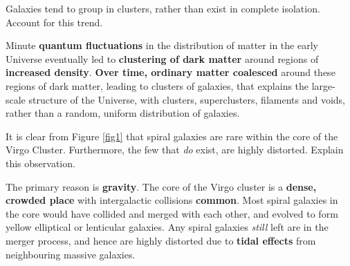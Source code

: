 \documentclass[a4paper,11pt]{exam}
\begin{document}
\begin{questions}
\clearpage
{}
\question[2]\label{1f}
	Galaxies tend to group in clusters, rather than exist in complete isolation. Account for this trend.
	\droppoints
	\begin{solution}
		Minute \textbf{quantum fluctuations} in the distribution of matter in the early Universe eventually led to \textbf{clustering of dark matter} around regions of \textbf{increased density}. \textbf{Over time, ordinary matter coalesced} around these regions of dark matter, leading to clusters of galaxies, that explains the large-scale structure of the Universe, with clusters, superclusters, filaments and voids, rather than a random, uniform distribution of galaxies. 
	\end{solution}

\question[2]\label{1g}
	It is clear from Figure \ref{fig1} that spiral galaxies are rare within the core of the Virgo Cluster. Furthermore, the few that \textit{do} exist, are highly distorted. Explain this observation.
	\droppoints
	\begin{solution}
		The primary reason is \textbf{gravity}. The core of the Virgo cluster is a \textbf{dense, crowded place} with intergalactic collisions \textbf{common}. Most spiral galaxies in the core would have collided and merged with each other, and evolved to form yellow elliptical or lenticular galaxies. Any spiral galaxies \textit{still} left are in the merger process, and hence are highly distorted due to \textbf{tidal effects} from neighbouring massive galaxies.
	\end{solution}

\filbreak
{}
\vspace*{-10pt}
\question
	\begin{parts}

\end{parts}
\end{questions}
\end{document}
